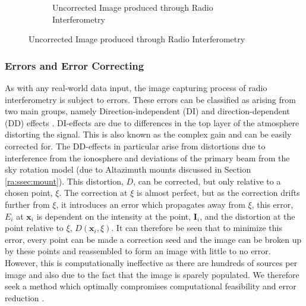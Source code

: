 \begin{figure}[H]
\begin{subfigure}{0.45\textwidth}
	\caption{Uncorrected Image produced through Radio Interferometry}
	\label{ra:fig:uncorr}
  \end{subfigure}
\end{figure}
%
\subsubsection{Errors and Error Correcting}\label{ra:ssec:eec}
As with any real-world data input, the image capturing process of radio interferometry is subject to errors. These errors can be classified as arising from two main groups, namely Direction-independent (DI) and direction-dependent (DD) effects \citep{smirnov2011revisiting}. DI-effects are due to differences in the top layer of the atmosphere distorting the signal. This is also known as the complex gain and can be easily corrected for. The DD-effects in particular arise from distortions due to interference from the ionosphere and deviations of the primary beam from the sky rotation model (due to Altazimuth mounts discussed in Section \ref{ra:ssec:mount}). This distortion, $D$, can be corrected, but only relative to a chosen point, $\xi$. The correction at $\xi$ is almost perfect, but as the correction drifts further from $\xi$, it introduces an error which propagates away from $\xi$, this error, $E_i$ at $\boldsymbol{x}_i$ is dependent on the intensity at the point, $\boldsymbol{I}_i$, and the distortion at the point relative to $\xi$, $D(\boldsymbol{x}_i,\xi)$. It can therefore be seen that to minimize this error, every point can be made a correction seed and the image can be broken up by these points and reassembled to form an image with little to no error. However, this is computationally ineffective as there are hundreds of sources per image and also due to the fact that the image is sparely populated. We therefore seek a method which optimally compromises computational feasibility and error reduction \citep{smirnov2015radio}.
